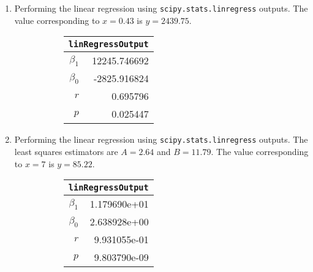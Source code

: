 \begin{enumerate}
\item Performing the linear regression using \texttt{scipy.stats.linregress} outputs.
The value corresponding to $ x = 0.43 $ is $ y = 2439.75 $.

\begin{figure}[H]
	\begin{subfigure}[]{0.2\linewidth}
		\centering
		\begin{tabular}{@{}rr@{}}
			\toprule
			\multicolumn{2}{c}{\texttt{linRegressOutput}} \\
			\midrule
			$\beta_1$     &     12245.746692 \\
			$\beta_0$ &     -2825.916824 \\
			$r$    &         0.695796 \\
			$p$    &         0.025447 \\
			\bottomrule
		\end{tabular}
		
	\end{subfigure}
	\begin{subfigure}[]{0.8\linewidth}
		\centering
		
	\end{subfigure}
\end{figure}


\item Performing the linear regression using \texttt{scipy.stats.linregress} outputs.
The least squares estimators are $ A = 2.64 $ and $ B = 11.79 $.
The value corresponding to $ x = 7 $ is $ y = 85.22 $.

\begin{figure}[H]
	\begin{subfigure}[]{0.2\linewidth}
		\centering
		\begin{tabular}{@{}rr@{}}
			\toprule
			\multicolumn{2}{c}{\texttt{linRegressOutput}} \\
			\midrule
			$\beta_1$     &     1.179690e+01 \\
			$\beta_0$ &     2.638928e+00 \\
			$r$    &     9.931055e-01 \\
			$p$    &     9.803790e-09 \\
			\bottomrule
		\end{tabular}
		

\end{subfigure}
\end{figure}
\end{enumerate}
